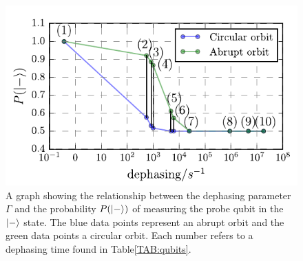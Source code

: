 \begin{figure}[h]
	\centering
	\includegraphics[width=1.05\linewidth]{../Figures/dephasing.pdf}
		\caption{A graph showing the relationship between the dephasing parameter $\Gamma$ and the probability $P(\ket{-})$ of measuring the probe qubit in the $\ket{-}$ state.  The blue data points represent an abrupt orbit and the green data points a circular orbit. Each number refers to a dephasing time found in Table\@ \ref{TAB:qubits}. }
		\label{fig:dephasingplot}
\end{figure}





